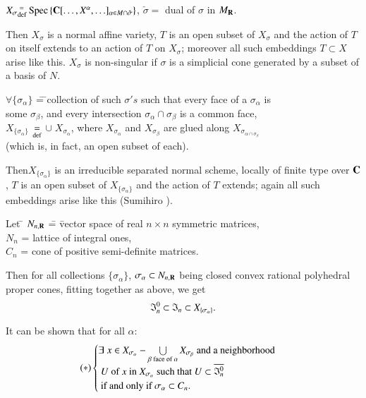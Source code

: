 \begin{itemize}
$X_\sigma {}^{\;=}_{\operatorname{def}} \operatorname{Spec} \left\{\mathbf{C} [\ldots, X^\alpha, \ldots]_{\alpha\in M \cap \check{\sigma}} \right\}$, $\check{\sigma} = $ dual of $\sigma$ in $M_{\mathbf{R}}$.

Then $X_\sigma$ is a normal affine variety, $T$ is an open subset of $X_\sigma$ and the action of $T$ on itself extends to an action of $T$ on $X_\sigma$; moreover all such embeddings $T \subset X$ arise like this. $X_\sigma$ is non-singular if $\sigma$ is a simplicial cone generated by a subset of a basis of $N$.
\begin{tabbing}
$\forall \{\sigma_\alpha\}$ \= = \= \;collection of such $\sigma's$ such that every face of a $\sigma_\alpha$ is\\
\> \> some $\sigma_\beta$, and every intersection $\sigma_\alpha \cap \sigma_\beta$ is a common face,\\
$X_{\{\sigma_\alpha\}}$ \> ${\displaystyle{\mathop{=}_{\operatorname{def}}}} $ \> \;$\cup \;X_{\sigma_\alpha}$, where $X_{\sigma_\alpha}$ and $X_{\sigma_\beta}$ are glued along $X_{\sigma_{\alpha \cap \sigma_\beta}}$\\
\> \> (which is, in fact, an open subset of each).
\end{tabbing}
Then\pageoriginale $X_{\{\sigma_\alpha\}}$ is an irreducible separated normal scheme, locally of finite type over $\mathbf{C}$, $T$ is an open subset of $X_{\{\sigma_\alpha\}}$ and the action of $T$ extends; again all such embeddings arise like this (Sumihiro \cite{art8-key10}).
\begin{tabbing}
Let \= $N_{n, \mathbf{R}}$ \= = \= vector space of real $n \times n$ symmetric matrices,\\
\> $N_n$ \> = \> lattice of integral ones,\\
\> $C_n$ \> = \> cone of positive semi-definite matrices.
\end{tabbing}
Then for all collections $\{\sigma_\alpha\}$, $\sigma_\alpha \subset N_{n, \mathbf{R}}$ being closed convex rational polyhedral proper cones, fitting together as above, we get
$$
\mathfrak{I}^0_n \subset \mathfrak{I}_n \subset X_{\{\sigma_\alpha\}}.
$$

It can be shown that for all $\alpha$:
$$
(\ast) 
\begin{cases}
\exists \; x \in X_{\sigma_\alpha} - \bigcup\limits_{\beta \text{ face of } \alpha} X_{\sigma_\beta}  \text{ and a neighborhood}\\
~ U \text{ of } x  \text{ in } X_{\sigma_\alpha} \text{ such that } U \subset \overline{\mathfrak{I}^0_n}\\
\text{ if and only if } \sigma_\alpha \subset C_n.
\end{cases}
$$


\end{itemize}
